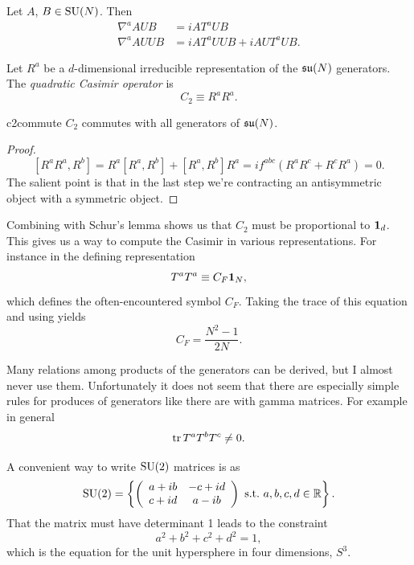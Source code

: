 \begin{example*}{}{}
Let $A$, $B\in\operatorname{SU}(N)$. Then
\begin{equation*}\begin{aligned}
\nabla^a AUB&=iAT^aUB\\
\nabla^a AUUB&=iAT^aUUB + iAUT^aUB.
\end{aligned}\end{equation*}
\end{example*}

Let $R^a$ be a $d$-dimensional irreducible representation of the
$\operatorname{\mathfrak{su}}(N)$ generators. The {\it quadratic Casimir operator}
is
\begin{equation}
C_2\equiv R^a R^a.
\end{equation}

\begin{proposition}{}{c2commute}
$C_2$ commutes with all generators of $\operatorname{\mathfrak{su}}(N)$.
\begin{proof}
$$
\left[R^a R^a, R^b\right]=R^a\left[R^a, R^b\right]+\left[R^a, R^b\right] R^a=i
f^{a b c}\left(R^a R^c+R^c R^a\right)=0.
$$
The salient point is that in the last step we're contracting an antisymmetric
object with a symmetric object.
\end{proof}
\end{proposition}
Combining  with Schur's lemma shows us that
$C_2$ must be proportional to ${\mathbf 1}_d$. This gives us a way
to compute the Casimir in various representations. For
instance in the defining representation
\begin{equation}
T^aT^a\equiv C_F{\mathbf 1}_N,
\end{equation}
which defines the often-encountered symbol $C_F$.
Taking the trace of this equation and using
 yields
\begin{equation}
C_F=\frac{N^2-1}{2N}.
\end{equation}

Many relations among products of the generators can be derived, but
I almost never use them. Unfortunately it does not seem that there
are especially simple rules for produces of generators like there
are with gamma matrices. For example in general
\begin{equation}
\tr T^aT^bT^c\neq0.
\end{equation}

A convenient way to write $\operatorname{SU}(2)$ matrices is as
\begin{equation}
\operatorname{SU}(2)=\left\{
\left(\begin{array}{cc}
          a+ib   & -c+id  \\ 
          c+id   &  a-ib  \\
            \end{array}\right)~\text{s.t.}~ a,b,c,d\in\mathbb{R} \right\}.
\end{equation} 
That the matrix must have determinant 1 leads to the constraint
\begin{equation}
a^2+b^2+c^2+d^2=1,
\end{equation} 
which is the equation for the unit hypersphere in four dimensions, $S^3$. 

